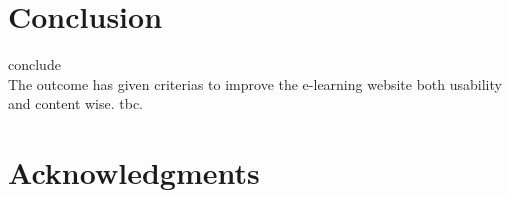 \documentclass{sigchi}
\begin{document}
\section{Conclusion}
conclude \\
The outcome has given criterias to improve the e-learning website both usability and content wise. tbc.
 
\section{Acknowledgments}

\balance{}



\end{document}
